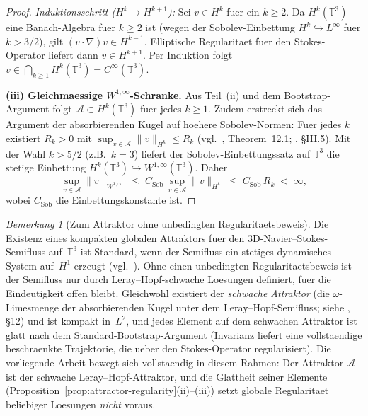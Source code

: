 \documentclass[12pt,a4paper]{article}
\theoremstyle{definition}
\theoremstyle{plain}
\theoremstyle{remark}
\newtheorem{remark}[definition]{Bemerkung}
\begin{document}
\begin{proof}
\emph{Induktionsschritt ($H^k \to H^{k+1}$):} Sei $v \in H^k$ fuer ein
$k \ge 2$. Da $H^k(\mathbb{T}^3)$ eine Banach-Algebra fuer $k \ge 2$ ist
(wegen der Sobolev-Einbettung $H^k \hookrightarrow L^\infty$ fuer $k > 3/2$),
gilt $(v\cdot\nabla)v \in H^{k-1}$. Elliptische Regularitaet fuer
den Stokes-Operator liefert dann $v \in H^{k+1}$. Per Induktion folgt
$v \in \bigcap_{k\ge 1} H^k(\mathbb{T}^3) = C^\infty(\mathbb{T}^3)$.

\medskip
\noindent\textbf{(iii) Gleichmaessige $W^{1,\infty}$-Schranke.}
Aus Teil~(ii) und dem Bootstrap-Argument folgt $\mathcal{A} \subset H^k(\mathbb{T}^3)$
fuer jedes $k \ge 1$. Zudem erstreckt sich das Argument der absorbierenden Kugel auf
hoehere Sobolev-Normen: Fuer jedes $k$ existiert $R_k > 0$ mit
$\sup_{v\in\mathcal{A}}\|v\|_{H^k} \le R_k$ (vgl.\ \cite{FoiasManleyRosaTemam2001},
Theorem~12.1; \cite{Temam2001}, \S III.5).
Mit der Wahl $k > 5/2$ (z.B.\ $k = 3$) liefert der Sobolev-Einbettungssatz auf
$\mathbb{T}^3$ die stetige Einbettung $H^k(\mathbb{T}^3) \hookrightarrow W^{1,\infty}(\mathbb{T}^3)$.
Daher
\[
    \sup_{v\in\mathcal{A}} \|v\|_{W^{1,\infty}}
    \;\le\; C_{\mathrm{Sob}}\,\sup_{v\in\mathcal{A}} \|v\|_{H^k}
    \;\le\; C_{\mathrm{Sob}}\,R_k
    \;<\; \infty,
\]
wobei $C_{\mathrm{Sob}}$ die Einbettungskonstante ist.
\end{proof}

\begin{remark}[Zum Attraktor ohne unbedingten Regularitaetsbeweis]
\label{rem:circularity}
Die Existenz eines kompakten globalen Attraktors fuer den 3D-Navier--Stokes-Semifluss
auf~$\mathbb{T}^3$ ist Standard, wenn der Semifluss ein stetiges dynamisches System
auf~$H^1$ erzeugt
(vgl.~\cite{Temam2001,FoiasManleyRosaTemam2001}). Ohne einen unbedingten
Regularitaetsbeweis ist der Semifluss nur durch Leray--Hopf-schwache Loesungen
definiert, fuer die Eindeutigkeit offen bleibt.
Gleichwohl existiert der \emph{schwache Attraktor} (die $\omega$-Limesmenge der
absorbierenden Kugel unter dem Leray--Hopf-Semifluss; siehe
\cite{FoiasManleyRosaTemam2001}, \S12) und ist kompakt
in~$L^2$, und jedes Element auf dem schwachen Attraktor ist glatt nach dem
Standard-Bootstrap-Argument (Invarianz liefert eine vollstaendige beschraenkte
Trajektorie, die ueber den Stokes-Operator regularisiert). Die vorliegende
Arbeit bewegt sich vollstaendig in diesem Rahmen: Der Attraktor
$\mathcal{A}$ ist der schwache Leray--Hopf-Attraktor, und die Glattheit
seiner Elemente (Proposition~\ref{prop:attractor-regularity}(ii)--(iii))
setzt globale Regularitaet beliebiger Loesungen \emph{nicht} voraus.
\end{remark}
\end{document}

